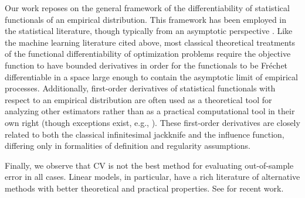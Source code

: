 Our work reposes on the general framework of the differentiability of
statistical functionals of an empirical distribution.  This framework has been
employed in the statistical literature, though typically from an asymptotic
perspective \citep[Chapter 20]{reeds:1976:thesis, fernholz:1983:mises,
van:2000:asymptotic}.  Like the machine learning literature cited above, most
classical theoretical treatments of the functional differentiability of
optimization problems require the objective function to have bounded derivatives
\citep{clarke:1983:uniqueness, shao:2012:jackknife} in order for the functionals
to be Fr{\'e}chet differentiable in a space large enough to contain the
asymptotic limit of empirical processes. Additionally, first-order derivatives
of statistical functionals with respect to an empirical distribution are often
used as a theoretical tool for analyzing other estimators rather than as a
practical computational tool in their own right \citep{mises:1947:asymptotic,
huber:1964:robust, shao:1993:jackknifemestimator} (though exceptions exist,
e.g., \citet{wager:2014:confidence}).  These first-order derivatives are closely
related to both the classical infinitesimal jackknife and the influence
function, differing only in formalities of definition and regularity
assumptions.

Finally, we observe that CV is not the best method for evaluating
out-of-sample error in all cases.  Linear models, in particular,
have a rich literature of alternative methods with better theoretical and
practical properties.  See \citet{efron:2004:estimation, rosset:2018:fixed}
for recent work.
